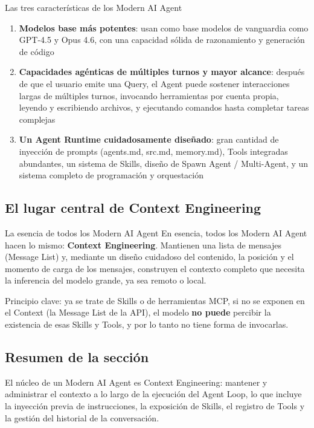 \documentclass[a4paper]{article}
\begin{document}
\begin{importantbox}{Las tres características de los Modern AI Agent}
\begin{enumerate}
    \item \textbf{Modelos base más potentes}: usan como base modelos de vanguardia como GPT-4.5 y Opus 4.6, con una capacidad sólida de razonamiento y generación de código
    \item \textbf{Capacidades agénticas de múltiples turnos y mayor alcance}: después de que el usuario emite una Query, el Agent puede sostener interacciones largas de múltiples turnos, invocando herramientas por cuenta propia, leyendo y escribiendo archivos, y ejecutando comandos hasta completar tareas complejas
    \item \textbf{Un Agent Runtime cuidadosamente diseñado}: gran cantidad de inyección de prompts (agents.md, src.md, memory.md), Tools integradas abundantes, un sistema de Skills, diseño de Spawn Agent / Multi-Agent, y un sistema completo de programación y orquestación
\end{enumerate}
\end{importantbox}

\subsection{El lugar central de Context Engineering}

\begin{importantbox}{La esencia de todos los Modern AI Agent}
En esencia, todos los Modern AI Agent hacen lo mismo: \textbf{Context Engineering}. Mantienen una lista de mensajes (Message List) y, mediante un diseño cuidadoso del contenido, la posición y el momento de carga de los mensajes, construyen el contexto completo que necesita la inferencia del modelo grande, ya sea remoto o local.

Principio clave: ya se trate de Skills o de herramientas MCP, si no se exponen en el Context (la Message List de la API), el modelo \textbf{no puede} percibir la existencia de esas Skills y Tools, y por lo tanto no tiene forma de invocarlas.
\end{importantbox}

\subsection{Resumen de la sección}

El núcleo de un Modern AI Agent es Context Engineering: mantener y administrar el contexto a lo largo de la ejecución del Agent Loop, lo que incluye la inyección previa de instrucciones, la exposición de Skills, el registro de Tools y la gestión del historial de la conversación.
\end{document}

